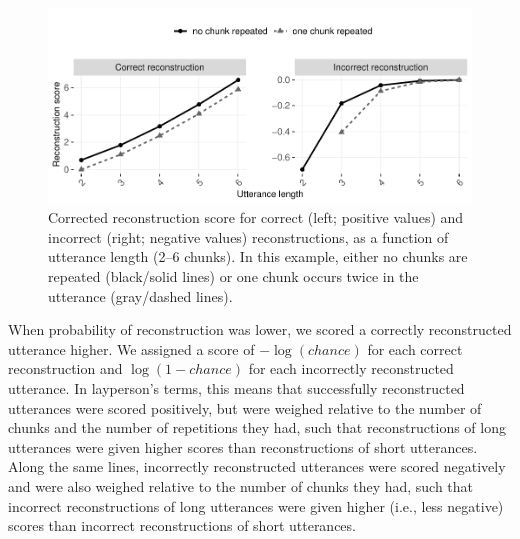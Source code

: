 \documentclass[
  english,
  man,floatsintext]{apa6}
\begin{document}
\begin{figure}
\includegraphics[width=0.95\linewidth]{CBL-age_invariance_files/figure-latex/fig3-1} \caption{Corrected reconstruction score for correct (left; positive values) and incorrect (right; negative values) reconstructions, as a function of utterance length (2--6 chunks). In this example, either no chunks are repeated (black/solid lines) or one chunk occurs twice in the utterance (gray/dashed lines).}\label{fig:fig3}
\end{figure}

When probability of reconstruction was lower, we scored a correctly reconstructed utterance higher. We assigned a score of \(-\log(chance)\) for each correct reconstruction and \(\log(1-chance)\) for each incorrectly reconstructed utterance. In layperson's terms, this means that successfully reconstructed utterances were scored positively, but were weighed relative to the number of chunks and the number of repetitions they had, such that reconstructions of long utterances were given higher scores than reconstructions of short utterances. Along the same lines, incorrectly reconstructed utterances were scored negatively and were also weighed relative to the number of chunks they had, such that incorrect reconstructions of long utterances were given higher (i.e., less negative) scores than incorrect reconstructions of short utterances.
\end{document}

